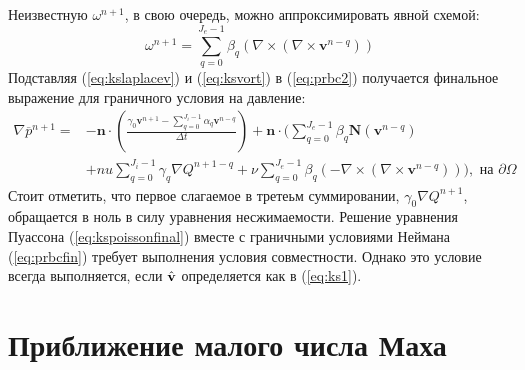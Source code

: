 Неизвестную $\omega^{n+1}$, в свою очередь, можно аппроксимировать явной схемой:
%
%
\begin{equation}\label{eq:ksvort} 
    \omega^{n+1} = \sum_{q=0}^{J_e-1} \beta_q (\nabla \times (\nabla \times \textbf{v}^{n-q}))
\end{equation}        
%
Подставляя (\ref{eq:kslaplacev}) и (\ref{eq:ksvort}) в (\ref{eq:prbc2}) получается
финальное выражение для граничного условия на давление:
%
%
\begin{equation}\label{eq:prbcfin} 
\begin{split}
    \nabla \overline{p}^{n+1} = & -\textbf{n} \cdot (\frac{\gamma_0 \textbf{v}^{n+1} - 
    \sum_{q=0}^{J_i-1} \alpha_q \textbf{v}^{n-q}}{\Delta t}) + \textbf{n} \cdot 
    (\sum_{q=0}^{J_e-1} \beta_q \textbf{N} (\textbf{v}^{n-q}) \\
    & + nu \sum_{q=0}^{J_i-1} \gamma_q \nabla Q^{n+1-q} + \nu \sum_{q=0}^{J_e-1}\beta_q 
    (-\nabla \times (\nabla \times \textbf{v}^{n-q}))), \text{ на } \partial \Omega\
\end{split}
\end{equation}    
%
Стоит отметить, что первое слагаемое в третеьм суммировании, $\gamma_0 \nabla Q^{n+1}$, обращается в ноль
в силу уравнения несжимаемости.
%
Решение уравнения Пуассона (\ref{eq:kspoissonfinal}) вместе с граничными условиями Неймана 
(\ref{eq:prbcfin}) требует выполнения условия совместности.
%
Однако это условие всегда выполняется, если $\Hat{\textbf{v}}$ определяется как в (\ref{eq:ks1}).

\section{Приближение малого числа Маха}
%

